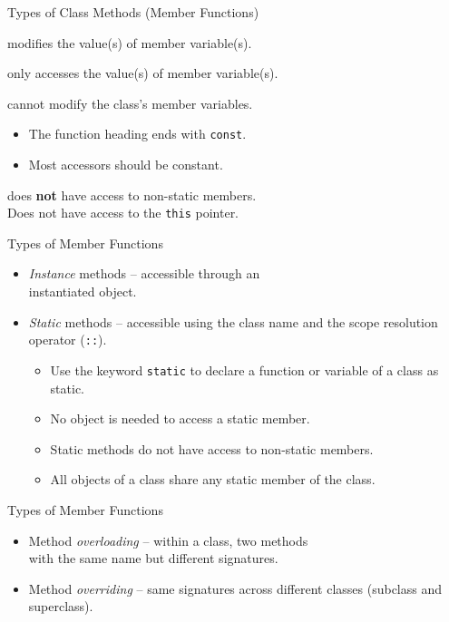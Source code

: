 \documentclass[14pt, aspectratio=1610, hyperref={pdfpagelayout=SinglePage}]{beamer}
\begin{document}
\begin{frame}{Types of Class Methods (Member Functions)}
\begin{description}[Accessor:]
\item[\textbf{\textcolor{white}{Mutator}}:]<+->
  modifies the value(s) of member variable(s).
\item[\textbf{\textcolor{white}{Accessor}}:]<+->
  only accesses the value(s) of member variable(s).
\item[\textbf{\textcolor{white}{Constant}}:]<+->
  cannot modify the class's member variables.
  \begin{itemize}
  \item
    The function heading ends with \lstinline{const}.
  \item
    Most accessors should be constant.
  \end{itemize}
\item[\textbf{\textcolor{white}{Static}}:]<+->
  does \textbf{not} have access to non-static members.\\Does not have access to the \lstinline{this} pointer.
\end{description}
\end{frame}



\begin{frame}{Types of Member Functions}
\begin{itemize}
\item<1->
  \emph{Instance} methods -- accessible through an\\ instantiated object.
\item<2->
  \emph{Static} methods -- accessible using the class name and the scope resolution operator (\lstinline{::}).
  \begin{itemize}
    \item Use the keyword \lstinline{static} to declare a function or variable of a class as static.
    \item No object is needed to access a static member.
    \item Static methods do not have access to non-static members.
    \item All objects of a class share any static member of the class.
  \end{itemize}
\end{itemize}
\end{frame}

\begin{frame}{Types of Member Functions}
  \begin{itemize}
  \item<1->
    Method \emph{overloading} -- within a class, two methods\\ with the same name but different signatures.
  \item<2->
  Method \emph{overriding} -- same signatures across different classes (subclass and superclass).
  \end{itemize}
\end{frame}
\end{document}
